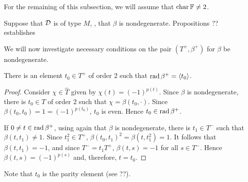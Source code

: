 For the remaining of this subsection, we will assume that $\operatorname{char} \mathbb{F} \neq 2$.

Suppose that $\mathcal{D}$ is of type $M$, \ie, that $\beta$ is nondegenerate. 
Propositions ?? establishes

We will now investigate necessary conditions on the pair $(T^+, \beta^+)$ for $\beta$ be nondegenerate. 


\begin{prop}\label{prop:parity-element}
    There is an element $t_0 \in T^+$ of order $2$ such that $\operatorname{rad} \beta^+ = \langle t_0 \rangle$.
\end{prop}

\begin{proof}
    Consider $\chi \in \widehat{T}$ given by $\chi(t) = (-1)^{p(t)}$. 
    Since $\beta$ is nondegenerate, there is $t_0\in T$ of order $2$ such that $\chi = \beta(t_0, \cdot)$. 
    Since $\beta(t_0, t_0) = 1 = (-1)^{p(t_0)}$, $t_0$ is even. 
    Hence $t_0 \in \operatorname{rad} \beta^+$. 
    
    If $0 \neq t \in \operatorname{rad} \beta^+$, using again that $\beta$ is nondegenerate, there is $t_1 \in T^-$ such that $\beta(t, t_1) \neq 1$. 
    Since $t_1^2 \in T^+$, $\beta(t_0, t_1)^2 = \beta(t, t_1^2) = 1$. 
    It follows that $\beta(t, t_1) = -1$, and since $T^- = t_1 T^+$, $\beta(t, s) = -1$ for all $s\in T^-$. 
    Hence $\beta(t, s) = (-1)^{p(s)}$ and, therefore, $t = t_0$.
\end{proof}

\begin{remark}\label{rmk:t_0-is-parity}
    Note that $t_0$ is the parity element (see ??).
\end{remark}


    
